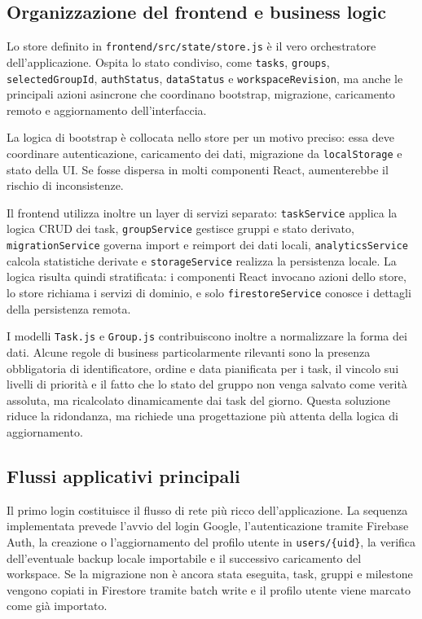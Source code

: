 \documentclass[11pt,a4paper]{article}
\begin{document}
\subsection{Organizzazione del frontend e business logic}

\par Lo store definito in \texttt{frontend/src/state/store.js} è il vero orchestratore dell'applicazione. Ospita lo stato condiviso, come \texttt{tasks}, \texttt{groups}, \texttt{selectedGroupId}, \texttt{authStatus}, \texttt{dataStatus} e \texttt{workspaceRevision}, ma anche le principali azioni asincrone che coordinano bootstrap, migrazione, caricamento remoto e aggiornamento dell'interfaccia.

\par La logica di bootstrap è collocata nello store per un motivo preciso: essa deve coordinare autenticazione, caricamento dei dati, migrazione da \texttt{localStorage} e stato della UI. Se fosse dispersa in molti componenti React, aumenterebbe il rischio di inconsistenze.

\par Il frontend utilizza inoltre un layer di servizi separato: \texttt{taskService} applica la logica CRUD dei task, \texttt{groupService} gestisce gruppi e stato derivato, \texttt{migrationService} governa import e reimport dei dati locali, \texttt{analyticsService} calcola statistiche derivate e \texttt{storageService} realizza la persistenza locale. La logica risulta quindi stratificata: i componenti React invocano azioni dello store, lo store richiama i servizi di dominio, e solo \texttt{firestoreService} conosce i dettagli della persistenza remota.

\par I modelli \texttt{Task.js} e \texttt{Group.js} contribuiscono inoltre a normalizzare la forma dei dati. Alcune regole di business particolarmente rilevanti sono la presenza obbligatoria di identificatore, ordine e data pianificata per i task, il vincolo sui livelli di priorità e il fatto che lo stato del gruppo non venga salvato come verità assoluta, ma ricalcolato dinamicamente dai task del giorno. Questa soluzione riduce la ridondanza, ma richiede una progettazione più attenta della logica di aggiornamento.
\newpage
\subsection{Flussi applicativi principali}

\par Il primo login costituisce il flusso di rete più ricco dell'applicazione. La sequenza implementata prevede l'avvio del login Google, l'autenticazione tramite Firebase Auth, la creazione o l'aggiornamento del profilo utente in \texttt{users/\{uid\}}, la verifica dell'eventuale backup locale importabile e il successivo caricamento del workspace. Se la migrazione non è ancora stata eseguita, task, gruppi e milestone vengono copiati in Firestore tramite batch write e il profilo utente viene marcato come già importato.
\end{document}
